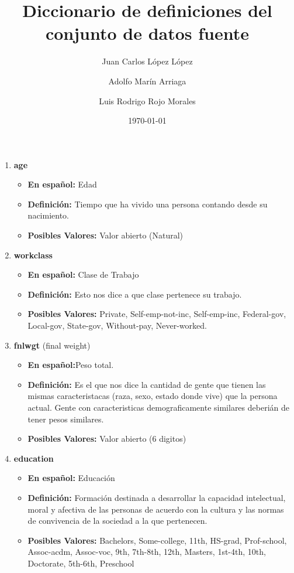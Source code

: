 \documentclass{article}
\title{Diccionario	de	definiciones	del	conjunto	de	datos	fuente}
\author{Juan Carlos López López \and Adolfo Marín Arriaga \and Luis Rodrigo Rojo Morales}
\date{\today\\}
\begin{document}
 \maketitle
 \begin{enumerate}
   \item \textbf{age}
     \begin{itemize}
       \item \textbf{En español:} Edad
       \item \textbf{Definición:} Tiempo que ha vivido una persona contando desde su nacimiento.
       \item \textbf{Posibles Valores:} Valor abierto (Natural)
     \end{itemize}
   \item \textbf{workclass}
     \begin{itemize}
       \item \textbf{En español:} Clase de Trabajo
       \item \textbf{Definición:} Esto nos dice a que clase pertenece su trabajo.
       \item \textbf{Posibles Valores:} Private, Self-emp-not-inc, Self-emp-inc, Federal-gov, Local-gov, State-gov, Without-pay, Never-worked.
     \end{itemize}
    \item \textbf{fnlwgt} (final weight)
    \begin{itemize}
       \item \textbf{En español:}Peso total.
       \item \textbf{Definición:} Es el que nos dice la cantidad de gente que tienen las mismas caracteristacas (raza, sexo, estado donde vive) que la persona actual. Gente con caracteristicas demograficamente similares deberián de tener pesos similares.
       \item \textbf{Posibles Valores:} Valor abierto (6 digitos)
    \end{itemize}
    \item \textbf{education}
     \begin{itemize}
       \item \textbf{En español:} Educación
       \item \textbf{Definición:} Formación destinada a desarrollar la capacidad intelectual, moral y afectiva de las personas de acuerdo con la cultura y las normas de convivencia de la sociedad a la que pertenecen.
       \item \textbf{Posibles Valores:}  Bachelors, Some-college, 11th, HS-grad, Prof-school, Assoc-acdm, Assoc-voc, 9th, 7th-8th, 12th, Masters, 1st-4th, 10th, Doctorate, 5th-6th, Preschool

\end{itemize}
\end{enumerate}
\end{document}
